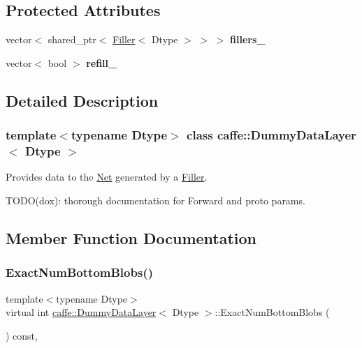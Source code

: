 \subsection*{Protected Attributes}
\begin{DoxyCompactItemize}
\item 
\mbox{\label{classcaffe_1_1_dummy_data_layer_a0b927ad66bd136298013ec6bae9da666}} 
vector$<$ shared\+\_\+ptr$<$ \mbox{\hyperlink{classcaffe_1_1_filler}{Filler}}$<$ Dtype $>$ $>$ $>$ {\bfseries fillers\+\_\+}
\item 
\mbox{\label{classcaffe_1_1_dummy_data_layer_a9a57b6691993ececae3b5a15327fc17b}} 
vector$<$ bool $>$ {\bfseries refill\+\_\+}
\end{DoxyCompactItemize}


\subsection{Detailed Description}
\subsubsection*{template$<$typename Dtype$>$\newline
class caffe\+::\+Dummy\+Data\+Layer$<$ Dtype $>$}

Provides data to the \mbox{\hyperlink{classcaffe_1_1_net}{Net}} generated by a \mbox{\hyperlink{classcaffe_1_1_filler}{Filler}}. 

T\+O\+D\+O(dox)\+: thorough documentation for Forward and proto params. 

\subsection{Member Function Documentation}
\mbox{\label{classcaffe_1_1_dummy_data_layer_a73101a8ace6de2b179e36c13be17cb17}} 
\subsubsection{\texorpdfstring{Exact\+Num\+Bottom\+Blobs()}{ExactNumBottomBlobs()}\hspace{0.1cm}{\footnotesize\ttfamily [1/2]}}
{\footnotesize\ttfamily template$<$typename Dtype$>$ \\
virtual int \mbox{\hyperlink{classcaffe_1_1_dummy_data_layer}{caffe\+::\+Dummy\+Data\+Layer}}$<$ Dtype $>$\+::Exact\+Num\+Bottom\+Blobs (\begin{DoxyParamCaption}{ }\end{DoxyParamCaption}) const\hspace{0.3cm}{\ttfamily [inline]}, {\ttfamily [virtual]}}



